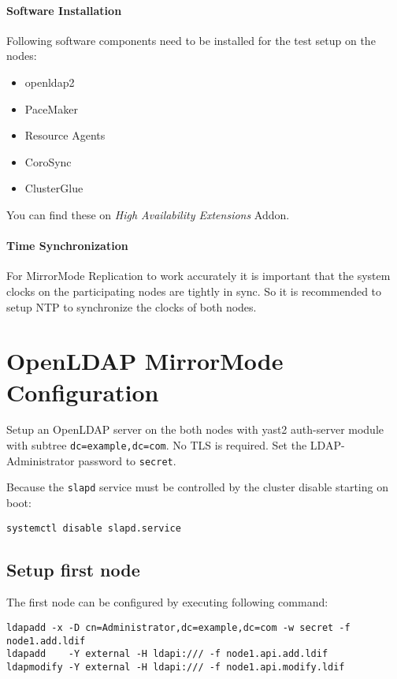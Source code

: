 \documentclass[a4paper,11pt,DIV=12]{scrartcl}
\begin{document}
\paragraph{Software Installation}
    Following software components need to be installed for the test setup on the nodes:
    \begin{itemize}
        \item openldap2
        \item PaceMaker
        \item Resource Agents
        \item CoroSync
        \item ClusterGlue
    \end{itemize}
    You can find these on \emph{High Availability Extensions} Addon.

\paragraph{Time Synchronization}
    For MirrorMode Replication to work accurately it is important that the
    system clocks on the participating nodes are tightly in sync. So it is
    recommended to setup NTP to synchronize the clocks of both nodes.

\section{OpenLDAP MirrorMode Configuration}
    Setup an OpenLDAP server on the both nodes with yast2 auth-server
    module with subtree \verb|dc=example,dc=com|. No TLS is required.
    Set the LDAP-Administrator password to \verb|secret|.

    Because the \verb|slapd| service must be controlled by the cluster
    disable starting on boot:

    \begin{verbatim}
systemctl disable slapd.service
    \end{verbatim}

\subsection{Setup first node}
    The first node can be configured by executing following command:
    \begin{verbatim}
ldapadd -x -D cn=Administrator,dc=example,dc=com -w secret -f node1.add.ldif
ldapadd    -Y external -H ldapi:/// -f node1.api.add.ldif 
ldapmodify -Y external -H ldapi:/// -f node1.api.modify.ldif
    \end{verbatim}
\end{document}
